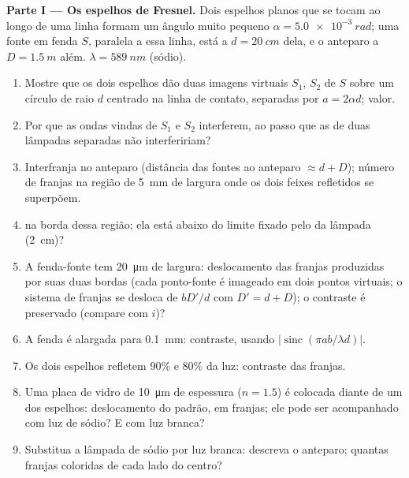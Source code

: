 \begin{problem}
\label{pb:b2:two-wave-interference:1}

\medskip
\noindent\textbf{Parte I --- Os espelhos de Fresnel.}
Dois espelhos planos que se tocam ao longo de uma linha formam um ângulo muito pequeno $\alpha =
\qty{5.0e-3}{rad}$; uma fonte em fenda $S$, paralela a essa linha, está a $d =
\qty{20}{cm}$ dela, e o anteparo a $D = \qty{1.5}{m}$ além. $\lambda =
\qty{589}{nm}$ (sódio).
\begin{enumerate}
  \item Mostre que os dois espelhos dão duas imagens virtuais $S_1$, $S_2$ de
        $S$ sobre um círculo de raio $d$ centrado na linha de contato,
        separadas por $a = 2\alpha d$; valor.
  \item Por que as ondas vindas de $S_1$ e $S_2$ interferem, ao passo que as de
        duas lâmpadas separadas não interfeririam?
  \item Interfranja no anteparo (distância das fontes ao
        anteparo $\approx d + D$); número de franjas na
        região de \qty{5}{mm} de largura onde os dois feixes refletidos se superpõem.
  \item {} na borda dessa região; ela está abaixo
        do limite fixado pelo  da lâmpada (\qty{2}{cm})?
  \item A fenda-fonte tem \qty{20}{\micro m} de largura: deslocamento das franjas
        produzidas por suas duas bordas (cada ponto-fonte é imageado em dois
        pontos virtuais; o sistema de franjas se desloca de $bD'/d$ com $D' =
        d + D$); o contraste é preservado (compare com $i$)?
  \item A fenda é alargada para \qty{0.1}{mm}: contraste, usando
        $|\operatorname{sinc}(\pi ab/\lambda d)|$.
  \item Os dois espelhos refletem $90\%$ e $80\%$ da luz: contraste
        das franjas.
  \item Uma placa de vidro de \qty{10}{\micro m} de espessura ($n = 1.5$) é colocada
        diante de um dos espelhos: deslocamento do padrão, em franjas; ele pode
        ser acompanhado com luz de sódio? E com luz branca?
  \item Substitua a lâmpada de sódio por luz branca: descreva o anteparo;
        quantas franjas coloridas de cada lado do centro?
\end{enumerate}


\end{problem}
